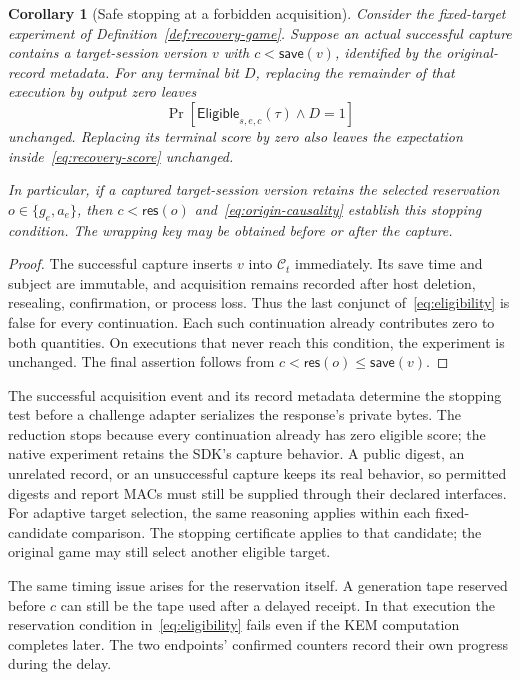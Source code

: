\documentclass[pdflatex]{sn-jnl}
\theoremstyle{thmstyleone}
\newtheorem{corollary}[theorem]{Corollary}
\theoremstyle{thmstylethree}
\theoremstyle{thmstyletwo}
\begin{document}
\begin{corollary}[Safe stopping at a forbidden acquisition]
\label{cor:target-acquisition-stop}
Consider the fixed-target experiment of
Definition~\ref{def:recovery-game}.  Suppose an actual successful capture
contains a target-session version $v$ with $c<\mathsf{save}(v)$, identified
by the original-record metadata.  For any terminal bit $D$, replacing the
remainder of that execution by output zero leaves
\[
   \Pr[\mathsf{Eligible}_{s,e,c}(\tau)\wedge D=1]
\]
unchanged.  Replacing its terminal score by zero also leaves the expectation
inside~\eqref{eq:recovery-score} unchanged.

In particular, if a captured target-session version retains the selected
reservation $o\in\{g_e,a_e\}$, then
$c<\mathsf{res}(o)$ and~\eqref{eq:origin-causality} establish this stopping
condition.  The wrapping key may be obtained before or after the capture.
\end{corollary}

\begin{proof}
The successful capture inserts $v$ into $\mathcal C_t$ immediately.
Its save time and subject are immutable, and acquisition remains recorded
after host deletion, resealing, confirmation, or process loss.  Thus the
last conjunct of~\eqref{eq:eligibility} is false for every continuation.
Each such continuation already contributes zero to both quantities.
On executions that never reach this condition, the experiment is unchanged.
The final assertion follows from
$c<\mathsf{res}(o)\leq\mathsf{save}(v)$.
\end{proof}

The successful acquisition event and its record metadata determine the
stopping test before a challenge adapter serializes the response's private
bytes. The reduction stops because every continuation already has zero
eligible score; the native experiment retains the SDK's capture behavior.
A public digest, an unrelated record, or an unsuccessful capture keeps its
real behavior, so permitted digests and report MACs must still be supplied
through their declared interfaces.
For adaptive target selection, the same reasoning applies within each
fixed-candidate comparison. The stopping certificate applies to that
candidate; the original game may still select another eligible target.

The same timing issue arises for the reservation itself. A generation
tape reserved before $c$ can still be the tape used after a delayed
receipt. In that execution the reservation condition
in~\eqref{eq:eligibility} fails even if the KEM computation completes
later. The two endpoints' confirmed counters record their own progress
during the delay.
\end{document}
